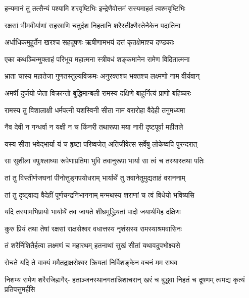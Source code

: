 \twolineshloka
{हन्यमानं तु तत्सैन्यं पश्यामि शरवृष्टिभिः}
{इन्द्रेणैवोत्तमं सस्यमाहतं त्वश्मवृष्टिभिः} %

\twolineshloka
{रक्षसां भीमवीर्याणां सहस्राणि चतुर्दश}
{निहतानि शरैस्तीक्ष्णैस्तेनैकेन पदातिना} %

\twolineshloka
{अर्धाधिकमुहूर्तेन खरश्च सहदूषणः}
{ऋषीणामभयं दत्तं कृतक्षेमाश्च दण्डकाः} %

\twolineshloka
{एका कथञ्चिन्मुक्ताहं परिभूय महात्मना}
{स्त्रीवधं शङ्कमानेन रामेण विदितात्मना} %

\twolineshloka
{भ्राता चास्य महातेजा गुणतस्तुल्यविक्रमः}
{अनुरक्तश्च भक्तश्च लक्ष्मणो नाम वीर्यवान्} %

\twolineshloka
{अमर्षी दुर्जयो जेता विक्रान्तो बुद्धिमान्बली}
{रामस्य दक्षिणे बाहुर्नित्यं प्राणो बहिष्चरः} %

\twolineshloka
{रामस्य तु विशालाक्षी धर्मपत्नी यशस्विनी}
{सीता नाम वरारोहा वैदेही तनुमध्यमा} %

\twolineshloka
{नैव देवी न गन्धर्वा न यक्षी न च किंनरी}
{तथारूपा मया नारी दृष्टपूर्वा महीतले} %

\twolineshloka
{यस्य सीता भवेद्भार्या यं च हृष्टा परिष्वजेत्}
{अतिजीवेत्स सर्वेषु लोकेष्वपि पुरन्दरात्} %

\twolineshloka
{सा सुशीला वपुःश्लाघ्या रूपेणाप्रतिमा भुवि}
{तवानुरूपा भार्या सा त्वं च तस्यास्तथा पतिः} %

\twolineshloka
{तां तु विस्तीर्णजघनां पीनोत्तुङ्गपयोधराम्}
{भार्यार्थे तु तवानेतुमुद्यताहं वराननाम्} %

\twolineshloka
{तां तु दृष्ट्वाद्य वैदेहीं पूर्णचन्द्रनिभाननाम्}
{मन्मथस्य शराणां च त्वं विधेयो भविष्यसि} %

\twolineshloka
{यदि तस्यामभिप्रायो भार्यार्थे तव जायते}
{शीघ्रमुद्ध्रियतां पादो जयार्थमिह दक्षिणः} %

\twolineshloka
{कुरु प्रियं तथा तेषां रक्षसां राक्षसेश्वर}
{वधात्तस्य नृशंसस्य रामस्याश्रमवासिनः} %

\twolineshloka
{तं शरैर्निशितैर्हत्वा लक्ष्मणं च महारथम्}
{हतनाथां सुखं सीतां यथावदुपभोक्ष्यसे} %

\twolineshloka
{रोचते यदि ते वाक्यं ममैतद्राक्षसेश्वर}
{क्रियतां निर्विशङ्केन वचनं मम राघव} %

\fourlineindentedshloka
{निशम्य रामेण शरैरजिह्मगैर्-}
{हताञ्जनस्थानगतान्निशाचरान्}
{खरं च बुद्ध्वा निहतं च दूषणम्}
{त्वमद्य कृत्यं प्रतिपत्तुमर्हसि} %


